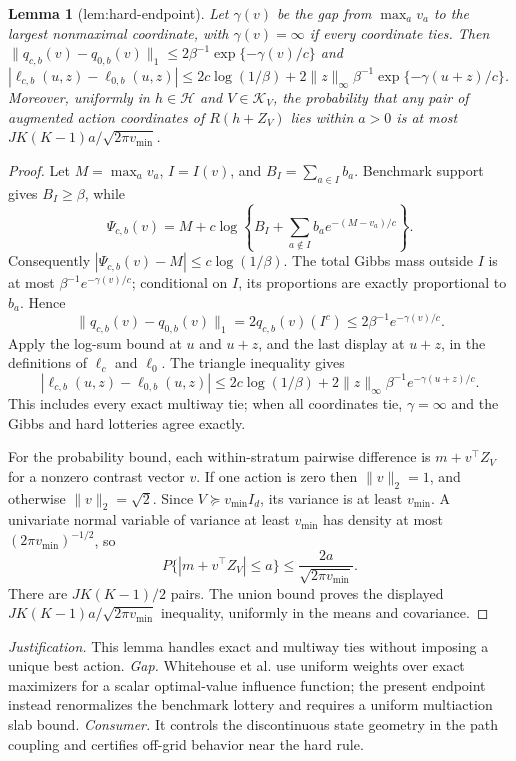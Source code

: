 \documentclass{article}
\newtheorem{lemma}{Lemma}
\begin{document}
\begin{lemma}[lem:hard-endpoint]\label{lem:hard-endpoint}
Let \(\gamma(v)\) be the gap from \(\max_av_a\) to the largest nonmaximal coordinate, with \(\gamma(v)=\infty\) if every coordinate ties. Then \(\|q_{c,b}(v)-q_{0,b}(v)\|_1\le2\beta^{-1}\exp\{-\gamma(v)/c\}\) and \(|\ell_{c,b}(u,z)-\ell_{0,b}(u,z)|\le2c\log(1/\beta)+2\|z\|_\infty\beta^{-1}\exp\{-\gamma(u+z)/c\}\). Moreover, uniformly in \(h\in\mathcal H\) and \(V\in\mathcal K_V\), the probability that any pair of augmented action coordinates of \(R(h+Z_V)\) lies within \(a>0\) is at most \(JK(K-1)a/\sqrt{2\pi v_{\min}}\).
\end{lemma}
\begin{proof}
Let \(M=\max_av_a\), \(I=I(v)\), and \(B_I=\sum_{a\in I}b_a\).  Benchmark support gives \(B_I\ge\beta\), while
\[
 \Psi_{c,b}(v)=M+c\log\left\{B_I+\sum_{a\notin I}b_ae^{-(M-v_a)/c}\right\}.
\]
Consequently \(|\Psi_{c,b}(v)-M|\le c\log(1/\beta)\).  The total Gibbs mass outside \(I\) is at most \(\beta^{-1}e^{-\gamma(v)/c}\); conditional on \(I\), its proportions are exactly proportional to \(b_a\).  Hence
\[
 \|q_{c,b}(v)-q_{0,b}(v)\|_1
 =2q_{c,b}(v)(I^c)
 \le2\beta^{-1}e^{-\gamma(v)/c}.
\]
Apply the log-sum bound at \(u\) and \(u+z\), and the last display at \(u+z\), in the definitions of \(\ell_c\) and \(\ell_0\).  The triangle inequality gives
\[
 |\ell_{c,b}(u,z)-\ell_{0,b}(u,z)|
 \le2c\log(1/\beta)+2\|z\|_\infty\beta^{-1}e^{-\gamma(u+z)/c}.
\]
This includes every exact multiway tie; when all coordinates tie, \(\gamma=\infty\) and the Gibbs and hard lotteries agree exactly.

For the probability bound, each within-stratum pairwise difference is \(m+v^\top Z_V\) for a nonzero contrast vector \(v\).  If one action is zero then \(\|v\|_2=1\), and otherwise \(\|v\|_2=\sqrt2\).  Since \(V\succeq v_{\min}I_d\), its variance is at least \(v_{\min}\).  A univariate normal variable of variance at least \(v_{\min}\) has density at most \((2\pi v_{\min})^{-1/2}\), so
\[
 P\{|m+v^\top Z_V|\le a\}\le\frac{2a}{\sqrt{2\pi v_{\min}}}.
\]
There are \(J K(K-1)/2\) pairs.  The union bound proves the displayed \(JK(K-1)a/\sqrt{2\pi v_{\min}}\) inequality, uniformly in the means and covariance.
\end{proof}
\par\smallskip\noindent \textit{Justification.} This lemma handles exact and multiway ties without imposing a unique best action. \textit{Gap.} Whitehouse et al. use uniform weights over exact maximizers for a scalar optimal-value influence function; the present endpoint instead renormalizes the benchmark lottery and requires a uniform multiaction slab bound. \textit{Consumer.} It controls the discontinuous state geometry in the path coupling and certifies off-grid behavior near the hard rule.
\end{document}
